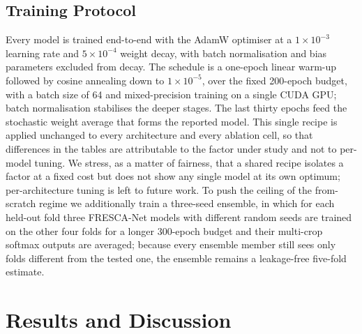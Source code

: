 \documentclass[conference]{IEEEtran}
\begin{document}
\subsection{Training Protocol}
Every model is trained end-to-end with the AdamW optimiser \cite{loshchilov_adamw} at a $1\times10^{-3}$ learning rate and $5\times10^{-4}$ weight decay, with batch normalisation and bias parameters excluded from decay. The schedule is a one-epoch linear warm-up followed by cosine annealing \cite{loshchilov_sgdr} down to $1\times10^{-5}$, over the fixed 200-epoch budget, with a batch size of 64 and mixed-precision training on a single CUDA GPU; batch normalisation \cite{ioffe_bn} stabilises the deeper stages. The last thirty epochs feed the stochastic weight average \cite{izmailov_swa} that forms the reported model. This single recipe is applied unchanged to every architecture and every ablation cell, so that differences in the tables are attributable to the factor under study and not to per-model tuning. We stress, as a matter of fairness, that a shared recipe isolates a factor at a fixed cost but does not show any single model at its own optimum; per-architecture tuning is left to future work. To push the ceiling of the from-scratch regime we additionally train a three-seed ensemble, in which for each held-out fold three FRESCA-Net models with different random seeds are trained on the other four folds for a longer 300-epoch budget and their multi-crop softmax outputs are averaged; because every ensemble member still sees only folds different from the tested one, the ensemble remains a leakage-free five-fold estimate.

\section{Results and Discussion}
\end{document}

